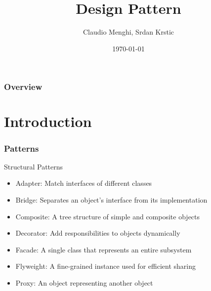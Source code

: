 \documentclass{beamer}
\title[Introduzione]{Design Pattern} %
\author{Claudio Menghi,  Srdan Krstic} %
\institute[Deepse group] %
{
Politecnico di Milano \\ %
\medskip
\textit{menghi@elet.polimi.it,  srdan.krstic@polimi.it} %
}
\date{\today} %
\begin{document}
\begin{frame}
\titlepage %
\end{frame}

\begin{frame}
\frametitle{Overview} %
\tableofcontents %
\end{frame}


\section{Introduction}

\begin{frame}
\frametitle{Patterns}
Structural	Patterns\\
\begin{itemize}
\item Adapter:	Match	interfaces	of	different	classes	
\item Bridge:	Separates	an	object’s	interface	from	its	 implementation	
\item Composite:	A	tree	structure	of	simple	and	composite	objects	
\item Decorator:	Add	responsibilities	to	objects	dynamically	
\item  Facade:	A	single	class	 that	 represents	an	 entire	subsystem
\item Flyweight:	A	fine-grained	instance	used	for	efficient	sharing	
\item Proxy:	An	object	representing	 another	object	
\end{itemize}	
\end{frame}
\end{document}
